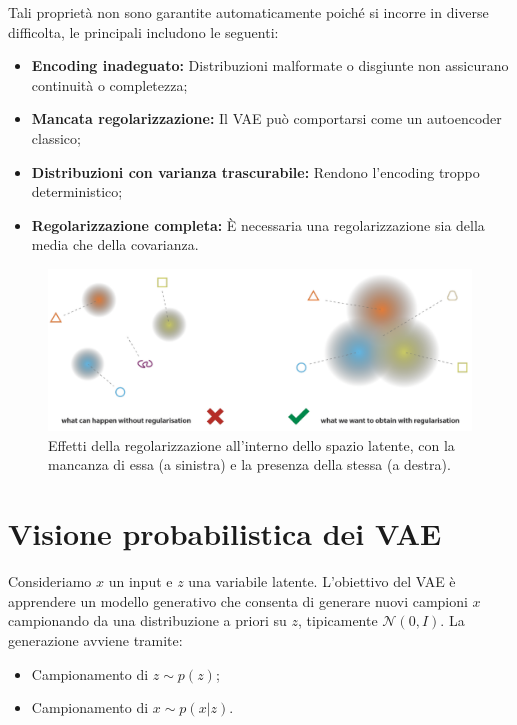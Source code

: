 Tali proprietà non sono garantite automaticamente poiché si incorre in diverse difficolta, le principali includono le seguenti:

\begin{itemize}
    \item \textbf{Encoding inadeguato:} Distribuzioni malformate o disgiunte non assicurano continuità o completezza;
    \item \textbf{Mancata regolarizzazione:} Il VAE può comportarsi come un autoencoder classico;
    \item \textbf{Distribuzioni con varianza trascurabile:} Rendono l’encoding troppo deterministico;
    \item \textbf{Regolarizzazione completa:} È necessaria una regolarizzazione sia della media che della covarianza.
\end{itemize}

\begin{figure}[!ht]
\centering
\includegraphics[width=\textwidth]{figure/RegEnc.png}
\caption{Effetti della regolarizzazione all'interno dello spazio latente, con la mancanza di essa (a sinistra) e la presenza della stessa (a destra).}
\label{fig:regEnc}
\end{figure}

\section{Visione probabilistica dei VAE}

Consideriamo $x$ un input e $z$ una variabile latente. L’obiettivo del VAE è apprendere un modello generativo che consenta di generare nuovi campioni $x$ campionando da una distribuzione a priori su $z$, tipicamente $\mathcal{N}(0, I)$. La generazione avviene tramite:

\begin{itemize}
    \item Campionamento di $z \sim p(z)$;
    \item Campionamento di $x \sim p(x|z)$.
\end{itemize}

